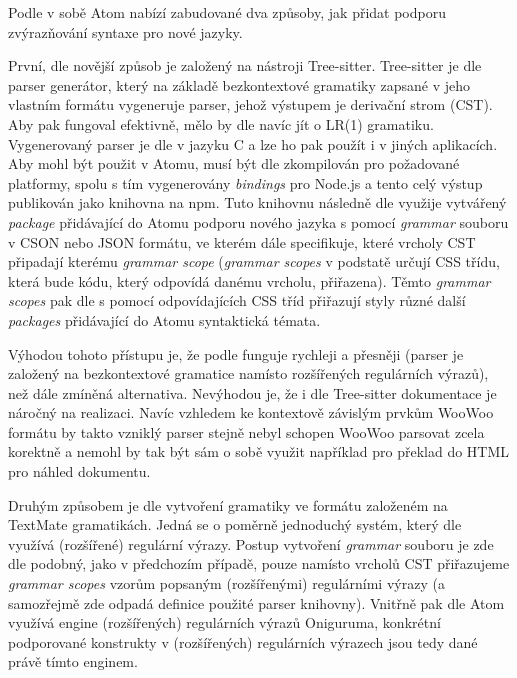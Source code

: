 Podle \cite{atom-docs} v sobě Atom nabízí zabudované dva způsoby, jak přidat podporu zvýrazňování syntaxe pro nové
jazyky.

První, dle \cite{atom-docs} novější způsob je založený na nástroji Tree-sitter. Tree-sitter je dle \cite
{tree-sitter-docs} parser generátor, který na základě bezkontextové gramatiky zapsané v jeho vlastním formátu vygeneruje
parser, jehož výstupem je derivační strom (CST). Aby pak fungoval efektivně, mělo by dle \cite{tree-sitter-docs} navíc
jít o LR(1) gramatiku. Vygenerovaný parser je dle \cite{tree-sitter-docs} v jazyku C a lze ho pak použít i v jiných
aplikacích. Aby mohl být použit v Atomu, musí být dle \cite{atom-docs} zkompilován pro požadované platformy, spolu s tím
vygenerovány \textit{bindings} pro Node.js a tento celý výstup publikován jako knihovna na npm. Tuto knihovnu následně
dle \cite{atom-docs} využije vytvářený \textit{package} přidávající do Atomu podporu nového jazyka s pomocí \textit
{grammar} souboru v CSON nebo JSON formátu, ve kterém dále specifikuje, které vrcholy CST připadají kterému \textit
{grammar scope} (\textit{grammar scopes} v podstatě určují CSS třídu, která bude kódu, který odpovídá danému vrcholu,
přiřazena). Těmto \textit{grammar scopes} pak dle \cite{atom-docs} s pomocí odpovídajících CSS tříd přiřazují styly
různé další \textit{packages} přidávající do Atomu syntaktická témata.

Výhodou tohoto přístupu je, že podle \cite{atom-docs} funguje rychleji a přesněji (parser je založený na bezkontextové
gramatice namísto rozšířených regulárních výrazů), než dále zmíněná alternativa. Nevýhodou je, že i dle Tree-sitter
dokumentace \cite{tree-sitter-docs} je náročný na realizaci. Navíc vzhledem ke kontextově závislým prvkům WooWoo formátu
by takto vzniklý parser stejně nebyl schopen WooWoo parsovat zcela korektně a nemohl by tak být sám o sobě využit
například pro překlad do HTML pro náhled dokumentu.

Druhým způsobem je dle \cite{atom-docs} vytvoření gramatiky ve formátu založeném na TextMate gramatikách. Jedná se o
poměrně jednoduchý systém, který dle \cite{atom-docs} využívá (rozšířené) regulární výrazy. Postup vytvoření \textit
{grammar} souboru je zde dle \cite{atom-docs} podobný, jako v předchozím případě, pouze namísto vrcholů CST přiřazujeme
\textit{grammar scopes} vzorům popsaným (rozšířenými) regulárními výrazy (a samozřejmě zde odpadá definice použité
parser knihovny). Vnitřně pak dle \cite{atom-docs} Atom využívá engine (rozšířených) regulárních výrazů Oniguruma,
konkrétní podporované konstrukty v (rozšířených) regulárních výrazech jsou tedy dané právě tímto enginem.

